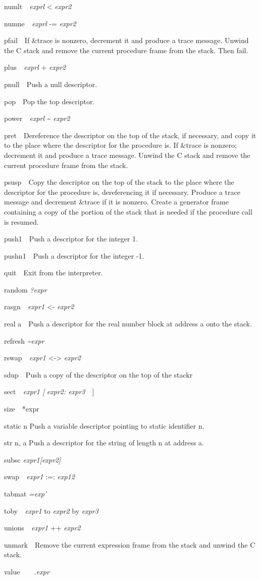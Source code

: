 numlt\textit{\ \ exprl }{\textless} \textit{expr2}


numne\textit{\ \ exprl }{}-= \textit{expr2}


pfail\ \ If \&trace is nonzero, decrement it and produce a trace
message. Unwind the C stack and remove the current procedure frame
from the stack. Then fail.


plus\textit{\ \ exprl }+ \textit{expr2}


pnull\ \ Push a null descriptor.


pop\ \ Pop the top descriptor.


power\textit{\ \ exprl }\~{} \textit{expr2}


pret\ \ Dereference the descriptor on the top of the stack, if
necessary, and copy it to the place where the descriptor for the
procedure is. If \&trace is nonzero; decrement it and produce a trace
message. Unwind the C stack and remove the current procedure frame
from the stack.


psusp\ \ Copy the descriptor on the top of the stack to the place
where the descriptor for the procedure is, dereferencing it if
necessary. Produce a trace message and decrement \&trace if it is
nonzero. Create a generator frame containing a copy of the portion of
the stack that is needed if the procedure call is resumed.


push1\ \ Push a descriptor for the integer 1.


pushn1\ \ Push a descriptor for the integer -1.


quit\ \ Exit from the interpreter.


random \textit{?expr}


rasgn\textit{\ \ expr1 }{\textless}- \textit{expr2}


real a\ \ Push a descriptor for the real number block at address a onto the stack.


refresh \textit{\~{}expr}


rswap\textit{\ \ expr1 }{\textless}-{\textgreater} \textit{expr2}


sdup\ \ Push a copy of the descriptor on the top of the stackr


sect\textit{\ \ expr1 [} \textit{expr2: expr3}\ \ ]


size\ \ *expr


static n Push a variable descriptor pointing to static identifier n.


str n, a Push a descriptor for the string of length n at address a.


subsc \textit{expr1[expr2]}


swap\textit{\ \ expr1 }:=: \textit{exp12}


tabmat \textit{=exp'}


toby\textit{\ \ expr1 }to \textit{expr2 }by \textit{expr3}


unions\textit{\ \ expr1 }++ \textit{expr2}


unmark\ \ Remove the current expression frame from the stack and
unwind the C stack.


value\ \ \ \ \textit{.expr}
